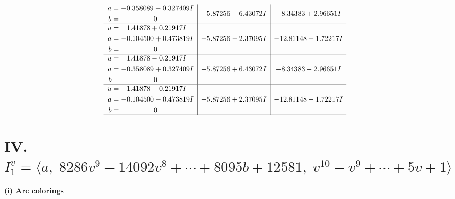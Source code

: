 \documentclass[1p]{elsarticle_modified}
\theoremstyle{definition}
\begin{document}
$$\begin{array}{c|c|c}
\begin{aligned}
a &= -0.358089 - 0.327409 I \\
b &= \phantom{-0.000000 } 0\end{aligned}
 & -5.87256 - 6.43072 I & -8.34383 + 2.96651 I \\ \hline\begin{aligned}
u &= \phantom{-}1.41878 + 0.21917 I \\
a &= -0.104500 + 0.473819 I \\
b &= \phantom{-0.000000 } 0\end{aligned}
 & -5.87256 - 2.37095 I & -12.81148 + 1.72217 I \\ \hline\begin{aligned}
u &= \phantom{-}1.41878 - 0.21917 I \\
a &= -0.358089 + 0.327409 I \\
b &= \phantom{-0.000000 } 0\end{aligned}
 & -5.87256 + 6.43072 I & -8.34383 - 2.96651 I \\ \hline\begin{aligned}
u &= \phantom{-}1.41878 - 0.21917 I \\
a &= -0.104500 - 0.473819 I \\
b &= \phantom{-0.000000 } 0\end{aligned}
 & -5.87256 + 2.37095 I & -12.81148 - 1.72217 I\\
 \hline 
 \end{array}$$\newpage\newpage\renewcommand{\arraystretch}{1}
\centering \section*{IV. $I^v_{1}= \langle a,\;8286 v^9-14092 v^8+\cdots+8095 b+12581,\;v^{10}- v^9+\cdots+5 v+1 \rangle$}
\flushleft \textbf{(i) Arc colorings}\\
\end{document}
